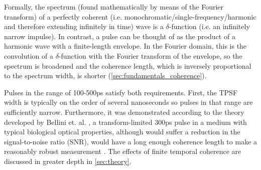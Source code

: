 Formally, the spectrum (found mathematically by means of the Fourier transform) of a perfectly coherent (i.e. monochromatic/single-frequency/harmonic and therefore extending infinitely in time) wave is a $\delta$-function (i.e. an infinitely narrow impulse). In contrast, a pulse can be thought of as the product of a harmonic wave with a finite-length envelope. In the Fourier domain, this is the convolution of a $\delta$-function with the Fourier transform of the envelope, so the spectrum is broadened and the coherence length, which is inversely proportional to the spectrum width, is shorter (\autoref{sec:fundamentals_coherence}).

Pulses in the range of 100-500ps satisfy both requirements. First, the TPSF width is typically on the order of several nanoseconds so pulses in that range are sufficiently narrow. Furthermore, it was demonstrated according to the theory developed by Bellini et. al. \cite{Bellini1991}, a transform-limited 300ps pulse in a medium with typical biological optical properties, although would suffer a reduction in the signal-to-noise ratio (SNR), would have a long enough coherence length to make a reasonably robust measurement \cite{TDDCSpatent}. The effects of finite temporal coherence are discussed in greater depth in \autoref{sec:theory}.


%